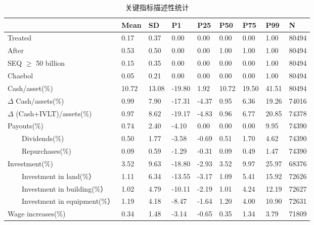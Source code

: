 \documentclass{article}
\begin{document}
\vspace{-0.7cm}

\begin{table}[H]
\caption{关键指标描述性统计}
\small
\begin{tabularx}{\textwidth}{lXXllXXXX}
\toprule
                                & Mean   & SD    & P1      & P25    & P50    & P75    & P99    & N     \\ \midrule
Treated                         & 0.17   & 0.37  & 0.00    & 0.00   & 0.00   & 0.00   & 1.00   & 80494 \\
After                           & 0.53   & 0.50  & 0.00    & 0.00   & 1.00   & 1.00   & 1.00   & 80494 \\
SEQ $\geq$ 50 billion           & 0.15   & 0.35  & 0.00    & 0.00   & 0.00   & 0.00   & 1.00   & 80494 \\
Chaebol                         & 0.05   & 0.21  & 0.00    & 0.00   & 0.00   & 0.00   & 1.00   & 80494 \\
Cash/asset(\%)                  & 10.72  & 13.08 & -19.80  & 1.92   & 10.72  & 19.50  & 41.51  & 80494 \\
$\Delta$ Cash/assets(\%)        & 0.99   & 7.90  & -17.31  & -4.37  & 0.95   & 6.36   & 19.26  & 74016 \\
$\Delta$ (Cash+IVLT)/assets(\%) & 0.97   & 8.62  & -19.17  & -4.83  & 0.96   & 6.77   & 20.85  & 74378 \\
Payouts(\%)                     & 0.74   & 2.40  & -4.10   & 0.00   & 0.00   & 0.00   & 9.95   & 74390 \\
$\qquad$Dividends(\%)                   & 0.50   & 1.77  & -3.58   & -0.69  & 0.51   & 1.70   & 4.62   & 74390 \\
$\qquad$Repurchases(\%)                 & 0.09   & 0.59  & -1.29   & -0.31  & 0.09   & 0.49   & 1.47   & 74390 \\
Investment(\%)                  & 3.52   & 9.63  & -18.80  & -2.93  & 3.52   & 9.97   & 25.97  & 68376 \\
$\qquad$Investment in land(\%）          & 1.11   & 6.34  & -13.55  & -3.17  & 1.09   & 5.41   & 15.92  & 72626 \\
$\qquad$Investment in building(\%）      & 1.02   & 4.79  & -10.11  & -2.19  & 1.01   & 4.24   & 12.19  & 72627 \\
$\qquad$Investment in equipment(\%）     & 1.19   & 4.18  & -8.47   & -1.64  & 1.20   & 4.00   & 10.90  & 72631 \\
Wage increases(\%)              & 0.34   & 1.48  & -3.14   & -0.65  & 0.35   & 1.34   & 3.79   & 71809 \\

\end{tabularx}
\end{table}
\end{document}
